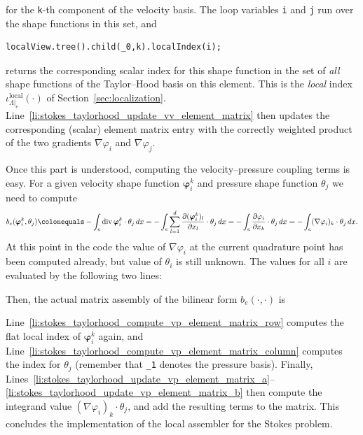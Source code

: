 \documentclass[a4paper,10pt,headings=normal,bibliography=totoc]{scrartcl}
\newcommand{\cpp}[1]{\lstinline[basicstyle=\ttfamily]!#1!}
\begin{document}
for the \cpp{k}-th component of the velocity basis.  The loop variables \cpp{i} and \cpp{j} run over
the shape functions in this set, and
\begin{lstlisting}[style=Example]
localView.tree().child(_0,k).localIndex(i);
\end{lstlisting}
returns the corresponding scalar index for this shape function in the set of \emph{all} shape functions
of the Taylor--Hood basis on this element.  This is the \emph{local} index
$\iota^{\text{local}}_{\Lambda|_e}(\cdot)$ of Section~\ref{sec:localization}.
Line~\ref{li:stokes_taylorhood_update_vv_element_matrix} then updates the corresponding (scalar)
element matrix entry with the correctly weighted product of the two gradients $\nabla \varphi_i$
and $\nabla \varphi_j$.

Once this part is understood, computing the velocity--pressure coupling terms is easy.
For a given velocity shape function $\bm{\varphi}_i^k$ and pressure shape function $\theta_j$ we need
to compute
\begin{equation*}
 b_e(\bm{\varphi}_i^k,\theta_j)
 \colonequals
 -\int_e \operatorname{div} \bm{\varphi}_i^k \cdot \theta_j\,dx
 =
 -\int_e \sum_{l=1}^d \frac{\partial (\bm{\varphi}_i^k)_l}{\partial x_l} \cdot \theta_j\,dx
 =
 -\int_e \frac{\partial \varphi_i}{\partial x_k} \cdot \theta_j\,dx
 =
 -\int_e (\nabla \varphi_i)_k \cdot \theta_j\,dx.
\end{equation*}
At this point in the code the value of $\nabla \varphi_i$ at the current quadrature point
has been computed already, but value of $\theta_i$ is still unknown.
The values for all $i$ are evaluated by the following two lines:
%

%
Then, the actual matrix assembly of the bilinear form $b_e(\cdot,\cdot)$ is
%

%
Line~\ref{li:stokes_taylorhood_compute_vp_element_matrix_row} computes the
flat local index of $\bm{\varphi}_i^k$ again,
and Line~\ref{li:stokes_taylorhood_compute_vp_element_matrix_column} computes the index for $\theta_j$ (remember that \cpp{_1} denotes
the pressure basis).  Finally, Lines~\ref{li:stokes_taylorhood_update_vp_element_matrix_a}--\ref{li:stokes_taylorhood_update_vp_element_matrix_b}
then compute the integrand value $(\nabla \varphi_i)_k \cdot \theta_j$,
and add the resulting terms to the matrix.
This concludes the implementation of the local assembler for the Stokes problem.






\end{document}
